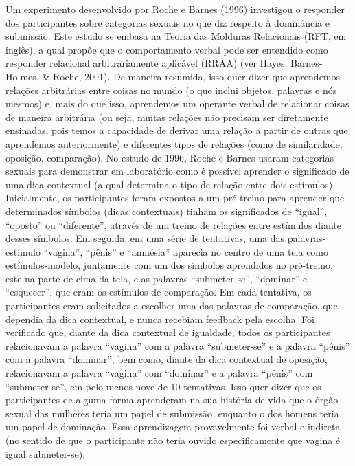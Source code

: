 Um experimento desenvolvido por Roche e Barnes (1996) investigou o responder dos participantes sobre categorias sexuais no que diz respeito à dominância e submissão. Este estudo se embasa na Teoria das Molduras Relacionais (RFT, em inglês), a qual propõe que o comportamento verbal pode ser entendido como responder relacional arbitrariamente aplicável (RRAA) (ver Hayes, Barnes-Holmes, \& Roche, 2001). De maneira resumida, isso quer dizer que aprendemos relações arbitrárias entre coisas no mundo (o que inclui objetos, palavras e nós mesmos) e, mais do que isso, aprendemos um operante verbal de relacionar coisas de maneira arbitrária (ou seja, muitas relações não precisam ser diretamente ensinadas, pois temos a capacidade de derivar uma relação a partir de outras que aprendemos anteriormente) e diferentes tipos de relações (como de similaridade, oposição, comparação). No estudo de 1996, Roche e Barnes usaram categorias sexuais para demonstrar em laboratório como é possível aprender o significado de uma dica contextual (a qual determina o tipo de relação entre dois estímulos). Inicialmente, os participantes foram expostos a um pré-treino para aprender que determinados símbolos (dicas contextuais) tinham os significados de ``igual'', ``oposto'' ou ``diferente'', através de um treino de relações entre estímulos diante desses símbolos. Em seguida, em uma série de tentativas, uma das palavras-estímulo ``vagina'', ``pênis'' e ``amnésia'' aparecia no centro de uma tela como estímulos-modelo, juntamente com um dos símbolos aprendidos no pré-treino, este na parte de cima da tela, e as palavras ``submeter-se'', ``dominar'' e ``esquecer'', que eram os estímulos de comparação. Em cada tentativa, os participantes eram solicitados a escolher uma das palavras de comparação, que dependia da dica contextual, e nunca recebiam feedback pela escolha. Foi verificado que, diante da dica contextual de igualdade, todos os participantes relacionavam a palavra ``vagina'' com a palavra ``submeter-se'' e a palavra ``pênis'' com a palavra ``dominar'', bem como, diante da dica contextual de oposição, relacionavam a palavra ``vagina'' com ``dominar'' e a palavra ``pênis'' com ``submeter-se'', em pelo menos nove de 10 tentativas. Isso quer dizer que os participantes de alguma forma aprenderam na sua história de vida que o órgão sexual das mulheres teria um papel de submissão, enquanto o dos homens teria um papel de dominação. Essa aprendizagem provavelmente foi verbal e indireta (no sentido de que o participante não teria ouvido especificamente que vagina é igual submeter-se).

